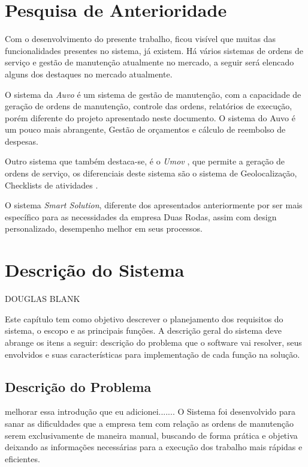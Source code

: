 \chapter{Pesquisa de Anterioridade}


Com o desenvolvimento do presente trabalho, ficou visível que muitas das funcionalidades presentes no sistema, já existem. Há vários sistemas de ordens de serviço e gestão de manutenção atualmente no mercado, a seguir será elencado alguns dos destaques no mercado atualmente.

O sistema da \textit{Auvo} é um sistema de gestão de manutenção, com a capacidade de geração de ordens de manutenção, controle das ordens, relatórios de execução, porém diferente do
projeto apresentado neste documento. O sistema do Auvo é um pouco mais abrangente,
Gestão de orçamentos e cálculo de reembolso de despesas.\cite{Auvo2019}

Outro sistema que também destaca-se, é o \textit{Umov} 
, que permite a geração de ordens de serviço,
os diferenciais deste sistema são o sistema de Geolocalização, Checklists de atividades \cite{umov2019}.

O sistema \textit{Smart Solution}, diferente dos apresentados anteriormente por ser mais específico para as
necessidades da empresa Duas Rodas, assim com design personalizado, desempenho melhor em seus processos.


\chapter{Descrição do Sistema }

DOUGLAS BLANK

Este capítulo tem como objetivo descrever o planejamento dos requisitos  do sistema, o escopo e as principais funções. A descrição geral do sistema deve abrange os itens a seguir: descrição do problema que o software vai resolver, seus envolvidos e suas características para implementação de cada função na solução.



\section{Descrição do Problema}
 {\color{red} melhorar essa introdução que eu adicionei.......
 O  Sistema foi desenvolvido para sanar as dificuldades que a empresa tem com relação as ordens de manutenção serem exclusivamente de maneira manual, buscando de forma prática e objetiva deixando as informações necessárias para a execução dos trabalho mais rápidas e eficientes.}

